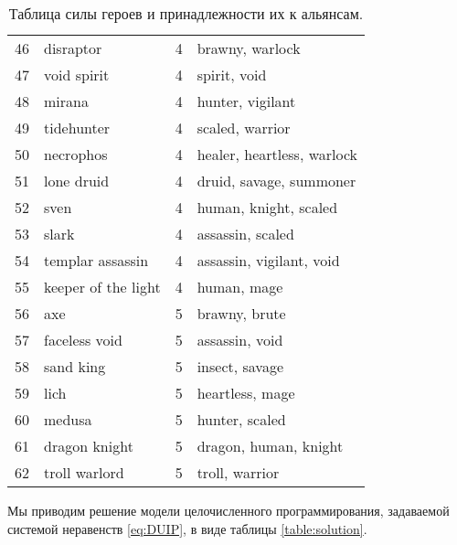 \documentclass{article}
\begin{document}
\begin{table}
{\begin{tabular}{llrl}
46 &            disraptor &      4 &               brawny, warlock  \\
47 &          void spirit &      4 &                   spirit, void \\
48 &               mirana &      4 &               hunter, vigilant \\
49 &           tidehunter &      4 &               scaled, warrior  \\
50 &            necrophos &      4 &    healer, heartless, warlock  \\
51 &           lone druid &      4 &        druid, savage, summoner \\
52 &                 sven &      4 &          human, knight, scaled \\
53 &                slark &      4 &               assassin, scaled \\
54 &     templar assassin &      4 &       assassin, vigilant, void \\
55 &  keeper of the light &      4 &                    human, mage \\
56 &                  axe &      5 &                  brawny, brute \\
57 &        faceless void &      5 &                 assassin, void \\
58 &            sand king &      5 &                 insect, savage \\
59 &                 lich &      5 &                heartless, mage \\
60 &               medusa &      5 &                 hunter, scaled \\
61 &        dragon knight &      5 &          dragon, human, knight \\
62 &        troll warlord &      5 &                troll, warrior  \\
\bottomrule
\end{tabular}
}
\caption{Таблица силы героев и принадлежности их к альянсам. }
\label{table:aliances}
\end{table}


Мы приводим решение модели целочисленного программирования, задаваемой системой неравенств  \eqref{eq:DUIP}, в виде таблицы \ref{table:solution}.
\end{document}
